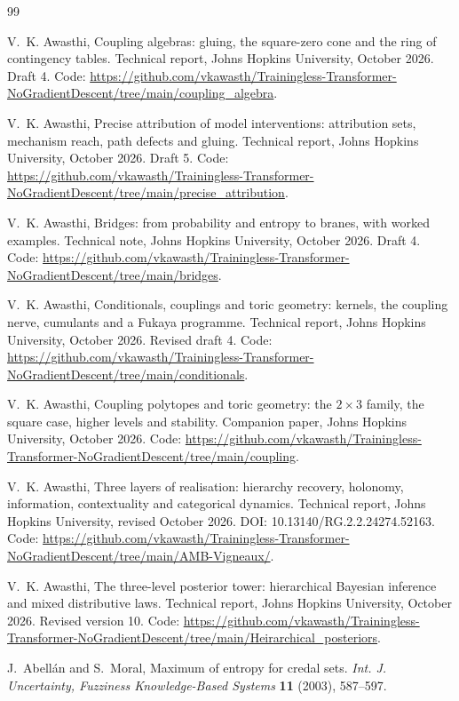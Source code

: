\documentclass[11pt]{article}
\theoremstyle{definition}
\theoremstyle{remark}
\begin{document}
\begin{thebibliography}{99}

V.~K. Awasthi, Coupling algebras: gluing, the square-zero cone and the ring of contingency tables. Technical report, Johns
Hopkins University, October 2026. Draft 4. Code: \url{https://github.com/vkawasth/Trainingless-Transformer-NoGradientDescent/tree/main/coupling_algebra}.

V.~K. Awasthi, Precise attribution of model interventions: attribution sets, mechanism reach, path defects and gluing.
Technical report, Johns Hopkins University, October 2026. Draft 5. Code: \url{https://github.com/vkawasth/Trainingless-Transformer-NoGradientDescent/tree/main/precise_attribution}.

V.~K. Awasthi, Bridges: from probability and entropy to branes, with worked examples. Technical note, Johns Hopkins University,
October 2026. Draft 4. Code: \url{https://github.com/vkawasth/Trainingless-Transformer-NoGradientDescent/tree/main/bridges}.

V.~K. Awasthi, Conditionals, couplings and toric geometry: kernels, the coupling nerve, cumulants and a {F}ukaya
programme. Technical report, Johns Hopkins University, October 2026. Revised draft 4. Code: \url{https://github.com/vkawasth/Trainingless-Transformer-NoGradientDescent/tree/main/conditionals}.

V.~K. Awasthi, Coupling polytopes and toric geometry: the $2\times3$ family, the square case, higher levels and stability.
Companion paper, Johns Hopkins University, October 2026. Code: \url{https://github.com/vkawasth/Trainingless-Transformer-NoGradientDescent/tree/main/coupling}.

V.~K. Awasthi, Three layers of realisation: hierarchy recovery, holonomy, information, contextuality and categorical
dynamics. Technical report, Johns Hopkins University, revised October 2026. DOI: 10.13140/RG.2.2.24274.52163. Code: \url{https://github.com/vkawasth/Trainingless-Transformer-NoGradientDescent/tree/main/AMB-Vigneaux/}.

V.~K. Awasthi, The three-level posterior tower: hierarchical {B}ayesian inference and mixed distributive laws.
Technical report, Johns Hopkins University, October 2026. Revised version 10. Code: \url{https://github.com/vkawasth/Trainingless-Transformer-NoGradientDescent/tree/main/Heirarchical_posteriors}.

J.~Abellán and S.~Moral, Maximum of entropy for credal sets. \emph{Int. J. Uncertainty, Fuzziness Knowledge-Based Systems}
\textbf{11} (2003), 587--597.


\end{thebibliography}
\end{document}
